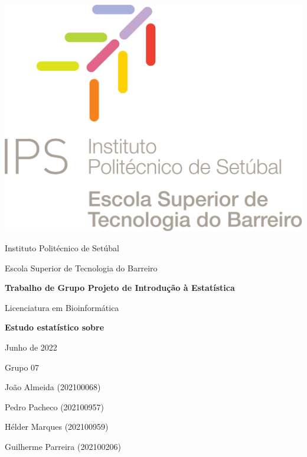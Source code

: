 \documentclass{article}
\begin{document}
\thispagestyle{empty}
\begin{flushleft}
\includegraphics[scale=0.15]{ESTB.jpg}
\end{flushleft}

\begin{center}
\Large{Instituto Politécnico de Setúbal}
\end{center}

\begin{center}
\Large{Escola Superior de Tecnologia do Barreiro}
\end{center}

\medskip %


\begin{center}
\Large{\textbf{Trabalho de Grupo Projeto de Introdução à Estatística}}
\end{center}
\begin{center}
\Large{Licenciatura em Bioinformática}
\end{center}

\vspace{3cm} %

\begin{center}
\huge{\textbf{Estudo estatístico sobre }} 
\end{center}


\begin{center}
\Large{Junho de 2022}
\end{center}

\medskip
\begin{center}
\large{Grupo 07}

\large{João Almeida (202100068)}

\large{Pedro Pacheco (202100957)}

\large{Hélder Marques (202100959)}

\large{Guilherme Parreira (202100206)}

\end{center}
\end{document}
